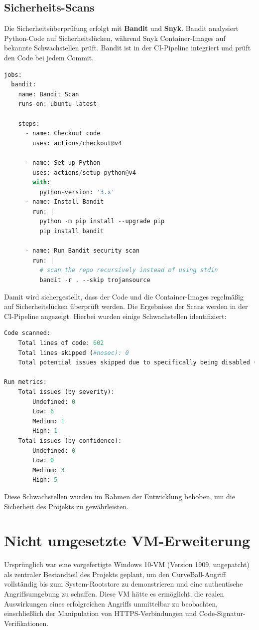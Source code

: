 \documentclass{article}
\begin{document}
\newpage

\subsection{Sicherheits-Scans}
Die Sicherheitsüberprüfung erfolgt mit \textbf{Bandit} und \textbf{Snyk}.
Bandit analysiert Python-Code auf Sicherheitslücken, während Snyk Container-Images auf bekannte Schwachstellen prüft.
Bandit ist in der CI-Pipeline integriert und prüft den Code bei jedem Commit.

\begin{lstlisting}[language=python,caption={bandit workflow file}]
jobs:
  bandit:
    name: Bandit Scan
    runs-on: ubuntu-latest

    steps:
      - name: Checkout code
        uses: actions/checkout@v4

      - name: Set up Python
        uses: actions/setup-python@v4
        with:
          python-version: '3.x'
      - name: Install Bandit
        run: |
          python -m pip install --upgrade pip
          pip install bandit

      - name: Run Bandit security scan
        run: |
          # scan the repo recursively instead of using stdin
          bandit -r . --skip trojansource
\end{lstlisting}

\noindent
Damit wird sichergestellt, dass der Code und die Container-Images regelmäßig auf Sicherheitslücken
überprüft werden. Die Ergebnisse der Scans werden in der CI-Pipeline angezeigt.
\noindent
Hierbei wurden einige Schwachstellen identifiziert:

\begin{lstlisting}[language=python,caption={bandit scan results}]
Code scanned:
	Total lines of code: 602
	Total lines skipped (#nosec): 0
	Total potential issues skipped due to specifically being disabled (e.g., #nosec BXXX): 0

Run metrics:
	Total issues (by severity):
		Undefined: 0
		Low: 6
		Medium: 1
		High: 1
	Total issues (by confidence):
		Undefined: 0
		Low: 0
		Medium: 3
		High: 5
\end{lstlisting}

\noindent
Diese Schwachstellen wurden im Rahmen der Entwicklung behoben, um die Sicherheit des Projekts zu gewährleisten. \\

\newpage

\section{Nicht umgesetzte VM-Erweiterung}
Ursprünglich war eine vorgefertigte Windows 10-VM (Version 1909, ungepatcht) als zentraler Bestandteil des Projekts geplant,
um den CurveBall-Angriff vollständig bis zum System-Rootstore zu demonstrieren und eine authentische Angriffsumgebung zu schaffen.
Diese VM hätte es ermöglicht, die realen Auswirkungen eines erfolgreichen Angriffs unmittelbar zu beobachten, einschließlich der
Manipulation von HTTPS-Verbindungen und Code-Signatur-Verifikationen.
\end{document}
